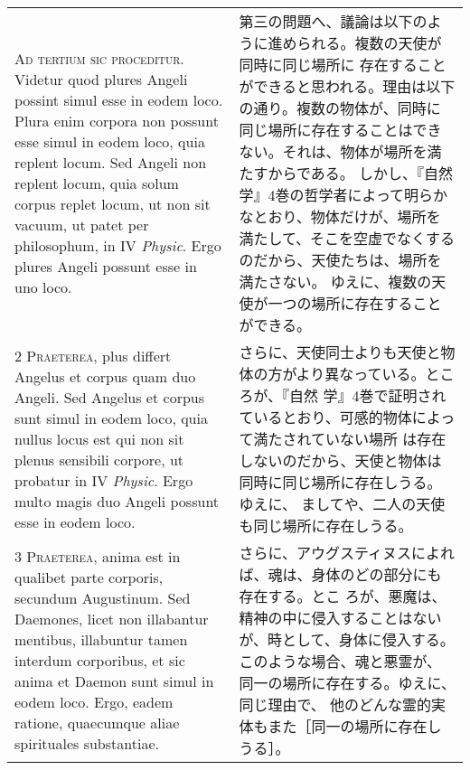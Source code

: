 \documentclass[10pt]{jsarticle} %
\begin{document}
\begin{longtable}{p{21em}p{21em}}

{\huge A}{\scshape d tertium sic proceditur}. Videtur quod
 plures Angeli possint simul esse in eodem loco. Plura enim corpora non
 possunt esse simul in eodem loco, quia replent locum. Sed Angeli non
 replent locum, quia solum corpus replet locum, ut non sit vacuum, ut
 patet per philosophum, in IV {\itshape Physic}. Ergo plures Angeli possunt esse in
 uno loco.

&

第三の問題へ、議論は以下のように進められる。複数の天使が同時に同じ場所に
 存在することができると思われる。理由は以下の通り。複数の物体が、同時に
 同じ場所に存在することはできない。それは、物体が場所を満たすからである。
 しかし、『自然学』4巻の哲学者によって明らかなとおり、物体だけが、場所を
 満たして、そこを空虚でなくするのだから、天使たちは、場所を満たさない。
 ゆえに、複数の天使が一つの場所に存在することができる。

\\



{\scshape 2 Praeterea}, plus differt Angelus et corpus
 quam duo Angeli. Sed Angelus et corpus sunt simul in eodem loco, quia
 nullus locus est qui non sit plenus sensibili corpore, ut probatur in
 IV {\itshape Physic}. Ergo multo magis duo Angeli possunt esse in eodem loco.

&
さらに、天使同士よりも天使と物体の方がより異なっている。ところが、『自然
 学』4巻で証明されているとおり、可感的物体によって満たされていない場所
 は存在しないのだから、天使と物体は同時に同じ場所に存在しうる。ゆえに、
 ましてや、二人の天使も同じ場所に存在しうる。

\\



{\scshape 3 Praeterea}, anima est in qualibet parte
 corporis, secundum Augustinum. Sed Daemones, licet non illabantur
 mentibus, illabuntur tamen interdum corporibus, et sic anima et Daemon
 sunt simul in eodem loco. Ergo, eadem ratione, quaecumque aliae
 spirituales substantiae.

&

さらに、アウグスティヌスによれば、魂は、身体のどの部分にも存在する。とこ
 ろが、悪魔は、精神の中に侵入することはないが、時として、身体に侵入する。
 このような場合、魂と悪霊が、同一の場所に存在する。ゆえに、同じ理由で、
 他のどんな霊的実体もまた［同一の場所に存在しうる］。

\\




\end{longtable}
\end{document}

